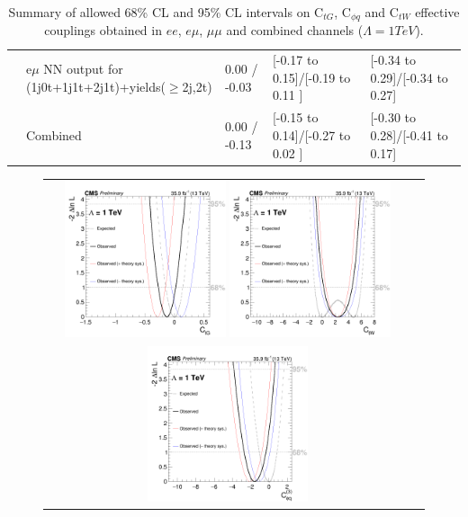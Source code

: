 \begin{table}[h]
{\begin{tabular}{|l|l|l|l|l|}
                              & e$\mu$   NN output for (1j0t+1j1t+2j1t)+yields($\geq$2j,2t)  & 0.00 / -0.03 &{[}-0.17 to 0.15{]}/{[}-0.19 to 0.11 {]}& {[}-0.34 to 0.29{]}/{[}-0.34 to 0.27{]}\\\cline{2-4}
                              & Combined                                                     & 0.00 / -0.13 &{[}-0.15 to 0.14{]}/{[}-0.27 to 0.02 {]}& {[}-0.30 to 0.28{]}/{[}-0.41 to 0.17{]}\\\hline \hline
\end{tabular}}
\caption{Summary of allowed 68\% CL and 95\% CL intervals on C$_{tG}$, C$_{\phi q}$ and C$_{tW}$ effective couplings  obtained in $ee$, $e\mu$, $\mu\mu$ and combined channels ($\Lambda = 1 TeV$).}
\label{tab:EFT_Limit}
\end{table}

\begin{figure}[ht]
  \begin{center}
    \begin{tabular}{cc}
      \includegraphics[width=0.45\textwidth]{figures/tW/fig/scan_all_plot/Ctg_combined_scan.png}
      \includegraphics[width=0.45\textwidth]{figures/tW/fig/scan_all_plot/Ctw_combined_scan.png}\\
      \includegraphics[width=0.45\textwidth]{figures/tW/fig/scan_all_plot/Cphiq_combined_scan.png}

\end{tabular}
\end{center}
\end{figure}
